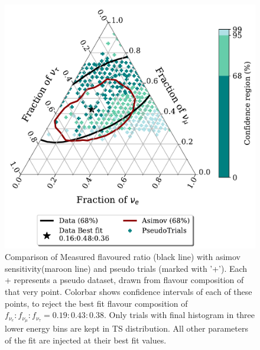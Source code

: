 \begin{figure}[h!]
    
    \includegraphics{./figures/results/PE_data_asimov_68_BkgOnly.pdf}


    \caption[Comparison of Measured flavoured ratio with asimov sensitivity and pseudo trials, with subset of trials having low signal/background analysis PDFs]{Comparison of Measured flavoured ratio (black line) with asimov sensitivity(maroon line) and pseudo trials (marked with '+'). Each + represents a pseudo dataset, drawn from flavour composition of that very point. Colorbar shows confidence intervals of each of these points, to reject the best fit flavour composition of $f_{\nu_e}:f_{\nu_{\mu}}:f_{\nu_{\tau}} = 0.19:0.43:0.38$. Only trials with final histogram in three lower energy bins are kept in TS distribution. All other parameters of the fit are injected at their best fit values.}
\end{figure}
